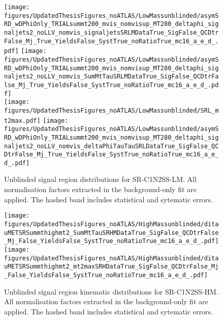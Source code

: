 \begin{figure}[!htpb]
\centering
\texttt{[image: figures/UpdatedThesisFigures\_noATLAS/LowMassunblinded/asymSRD\_wDPhiOnly\_TRIALsummt200\_mvis\_nomvisup\_MT280\_deltaphi\_signaljets2\_noLLV\_nomvis\_signaljetsSRLMDataTrue\_SigFalse\_QCDtrFalse\_Mj\_True\_YieldsFalse\_SystTrue\_noRatioTrue\_mc16\_a\_e\_d\_.pdf]}
\texttt{[image: figures/UpdatedThesisFigures\_noATLAS/LowMassunblinded/asymSRD\_wDPhiOnly\_TRIALsummt200\_mvis\_nomvisup\_MT280\_deltaphi\_signaljets2\_noLLV\_nomvis\_SumMtTauSRLMDataTrue\_SigFalse\_QCDtrFalse\_Mj\_True\_YieldsFalse\_SystTrue\_noRatioTrue\_mc16\_a\_e\_d\_.pdf]}\\
\texttt{[image: figures/UpdatedThesisFigures\_noATLAS/LowMassunblinded/SRL\_mt2max.pdf]}
\texttt{[image: figures/UpdatedThesisFigures\_noATLAS/LowMassunblinded/asymSRD\_wDPhiOnly\_TRIALsummt200\_mvis\_nomvisup\_MT280\_deltaphi\_signaljets2\_noLLV\_nomvis\_deltaPhiTauTauSRLDataTrue\_SigFalse\_QCDtrFalse\_Mj\_True\_YieldsFalse\_SystTrue\_noRatioTrue\_mc16\_a\_e\_d\_.pdf]}\\
\caption{ Unblinded signal region distributions for SR-C1N2SS-LM.  All normalisation factors extracted in the background-only fit are applied.  The hashed band includes statistical and sytematic errors.
\label{fig:analysis:unblindedSRLM}}
\end{figure}

\begin{figure}[!htpb]
\centering
\texttt{[image: figures/UpdatedThesisFigures\_noATLAS/HighMassunblinded/ditauMETSRSummthighmt2\_SumMtTauSRHMDataTrue\_SigFalse\_QCDtrFalse\_Mj\_False\_YieldsFalse\_SystTrue\_noRatioTrue\_mc16\_a\_e\_d\_.pdf]}
\texttt{[image: figures/UpdatedThesisFigures\_noATLAS/HighMassunblinded/ditauMETSRSummthighmt2\_mt2maxSRHDataTrue\_SigFalse\_QCDtrFalse\_Mj\_False\_YieldsFalse\_SystTrue\_noRatioTrue\_mc16\_a\_e\_d\_.pdf]}\\
\caption{ Unblinded signal region kinematic distributions for SR-C1N2SS-HM.  All normalisation factors extracted in the background-only fit are applied.  The hashed band includes statistical and sytematic errors.
\label{fig:analysis:unblindedSRHM}}
\end{figure}

